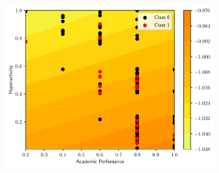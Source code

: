 \begin{figure}
\begin{subfigure}[b]{0.32\textwidth}
    \includegraphics[width=\textwidth]{figs/svm-linear-contour-1-5.pdf}
    \caption{}
    \label{fig:SVM-linear2c}
  \end{subfigure}


\end{figure}
